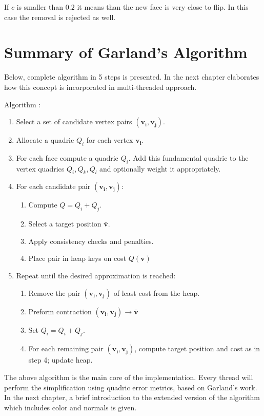 If $c$ is smaller than $0.2$ it means than the new face is very close to flip. In this case the removal is rejected as well. 

\newpage
\section{Summary of Garland's Algorithm}

Below, complete algorithm in 5 steps is presented. In the next chapter elaborates how this concept is incorporated in multi-threaded approach.

Algorithm \cite{garland99}:

\begin{enumerate}
\item Select a set of candidate vertex pairs $(\mathbf{v_i}, \mathbf{v_j})$.
\item Allocate a quadric $Q_i$ for each vertex $\mathbf{v_i}$.
\item For each face compute a quadric $Q_i$. Add this fundamental quadric to the vertex quadrics $Q_i, Q_k, Q_l$ and optionally weight it appropriately.
\item For each candidate pair $(\mathbf{v_i}, \mathbf{v_j})$:
\begin{enumerate}
\item Compute $Q = Q_i + Q_j$.
\item Select a target position $\mathbf{\bar{v}}$.
\item Apply consistency checks and penalties.
\item Place pair in heap keys on cost $Q(\mathbf{\bar{v}})$
\end{enumerate}
\item Repeat until the desired approximation is reached:
\begin{enumerate}
\item Remove the pair $(\mathbf{v_i}, \mathbf{v_j})$ of least cost from the heap.
\item Preform contraction $(\mathbf{v_i}, \mathbf{v_j})\rightarrow\bar{\mathbf{v}}$
\item Set $Q_i = Q_i + Q_j$.
\item For each remaining pair $(\mathbf{v_i}, \mathbf{v_j})$, compute target position and cost as in step 4; update heap.
\end{enumerate}
\end{enumerate}

The above algorithm is the main core of the implementation. Every thread will perform the simplification using quadric error metrics, based on Garland's work. In the next chapter, a brief introduction to the extended version of the algorithm which includes color and normals is given.

